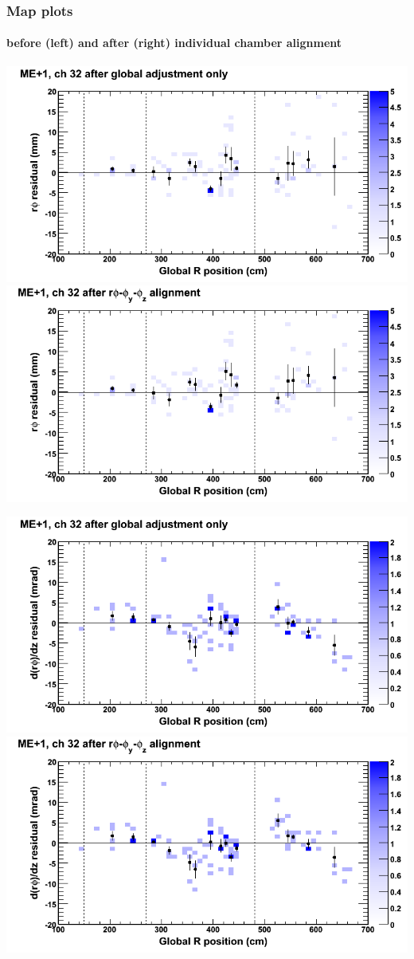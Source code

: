 \documentclass[compress]{beamer}
\begin{document}
\begin{frame}
\frametitle{Map plots}
\framesubtitle{before (left) and after (right) individual chamber alignment}
\includegraphics[width=0.5\linewidth]{ringmapplots_3dof/before_CSCvsr_mep1ch32_x.png} \includegraphics[width=0.5\linewidth]{ringmapplots_3dof/after_CSCvsr_mep1ch32_x.png}

\includegraphics[width=0.5\linewidth]{ringmapplots_3dof/before_CSCvsr_mep1ch32_dxdz.png} \includegraphics[width=0.5\linewidth]{ringmapplots_3dof/after_CSCvsr_mep1ch32_dxdz.png}
\end{frame}
\end{document}
